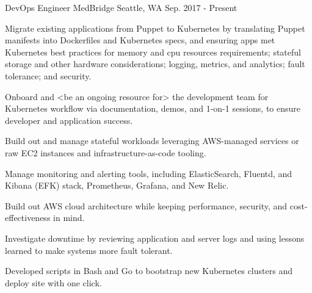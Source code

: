 


\begin{cventries}


\cventry
{DevOps Engineer} %
{MedBridge} %
{Seattle, WA} %
{Sep. 2017 - Present} %
{ %
\begin{cvitems}
\item {Migrate existing applications from Puppet to Kubernetes by translating Puppet manifests into Dockerfiles and Kubernetes specs, and ensuring apps met Kubernetes best practices for memory and cpu resources requirements; stateful storage and other hardware considerations; logging, metrics, and analytics; fault tolerance; and security.}
\item {Onboard and <be an ongoing resource for> the development team for Kubernetes workflow via documentation, demos, and 1-on-1 sessions, to ensure developer and application success.}
\item {Build out and manage stateful workloads leveraging AWS-managed services or raw EC2 instances and infrastructure-as-code tooling.}
\item {Manage monitoring and alerting tools, including ElasticSearch, Fluentd, and Kibana (EFK) stack, Prometheus, Grafana, and New Relic.}
\item {Build out AWS cloud architecture while keeping performance, security, and cost-effectiveness in mind.}
\item {Investigate downtime by reviewing application and server logs and using lessons learned to make systems more fault tolerant.}
\item {Developed scripts in Bash and Go to bootstrap new Kubernetes clusters and deploy site with one click.}
\end{cvitems}
}



\end{cventries}
